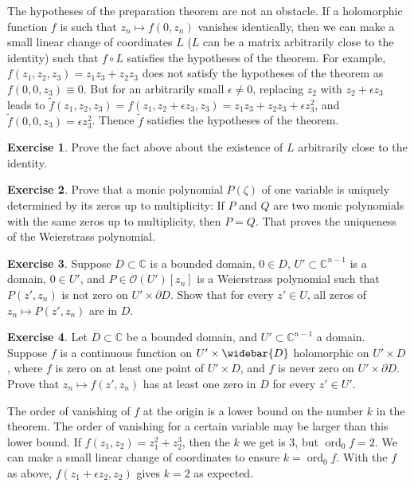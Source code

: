 \documentclass[12pt,openany]{book}
\newcommand{\ord}{\operatorname{ord}}
\newcommand{\C}{{\mathbb{C}}}
\newcommand{\sO}{{\mathscr{O}}}
\theoremstyle{plain}
\theoremstyle{remark}
\theoremstyle{definition}
\newenvironment{exbox}{%
    \def\FrameCommand{\vrule width 1pt \relax\hspace{10pt}}%
    \MakeFramed{\advance\hsize-\width\FrameRestore}%
}{%
    \endMakeFramed
}
\theoremstyle{exercise}
\newtheorem{exercise}{Exercise}[section]
\theoremstyle{example}
\begin{document}
The hypotheses of the preparation theorem are not an obstacle.  If a holomorphic
function $f$ is such that $z_n \mapsto f(0,z_n)$ vanishes identically,
then we can make a small linear change of
coordinates $L$ ($L$ can be a matrix arbitrarily close to the identity) such
that $f \circ L$ satisfies the hypotheses of the theorem.
For example, $f(z_1,z_2,z_3) = z_1z_3+z_2z_3$ does not satisfy the
hypotheses of the theorem as $f(0,0,z_3) \equiv 0$.  But for an arbitrarily
small $\epsilon \not= 0$, replacing
$z_2$ with $z_2 + \epsilon z_3$ leads to $\tilde{f}(z_1,z_2,z_3)
= f(z_1,z_2+\epsilon z_3,z_3) =
z_1z_3+z_2z_3 + \epsilon z_3^2$, and $\tilde{f}(0,0,z_3) = \epsilon z_3^2$.
Thence $\tilde{f}$
satisfies the hypotheses of the theorem.

\begin{exbox}
\begin{exercise}
Prove the fact above about the existence of $L$ arbitrarily close to the
identity.
\end{exercise}

\begin{exercise} \label{exercise:monicpolyunique}
Prove that a monic polynomial $P(\zeta)$ of one variable is
uniquely determined by its zeros up to multiplicity:
If $P$ and $Q$ are two monic polynomials with the same zeros
up to multiplicity,
then $P=Q$.  That proves the uniqueness of the Weierstrass polynomial.
\end{exercise}

\begin{exercise}
Suppose $D \subset \C$ is a bounded domain, $0 \in D$,
$U' \subset \C^{n-1}$ is a domain, $0 \in U'$,
and $P \in \sO(U')[z_n]$ is a Weierstrass polynomial
such that $P(z',z_n)$ is not zero on $U' \times \partial D$.
Show that for every $z' \in U$, all zeros of $z_n \mapsto P(z',z_n)$ are in $D$.
\end{exercise}

\begin{exercise}
Let $D \subset \C$ be a bounded domain,
and
$U' \subset \C^{n-1}$ a domain.
Suppose
$f$ is a continuous function on
$U' \times \widebar{D}$ holomorphic on $U' \times D$,
where $f$ is zero on at least one point
of $U' \times D$, and $f$ is never zero on
$U' \times \partial D$.
Prove that
$z_n \mapsto f(z',z_n)$ has at least one zero in $D$ for every $z' \in U'$.
\end{exercise}
\end{exbox}

\pagebreak[2]
The order of vanishing of $f$ at the origin is a lower bound
on the number $k$ in the theorem.  The order of vanishing for a certain
variable may be larger than this lower bound.  If $f(z_1,z_2) =
z_1^2 + z_2^3$, then the $k$ we get is $3$, but $\ord_0 f = 2$.
We can make a small
linear change of coordinates to ensure $k = \ord_0 f$.
With the $f$ as above, $f(z_1 + \epsilon z_2,z_2)$ gives $k = 2$
as expected.
\end{document}
